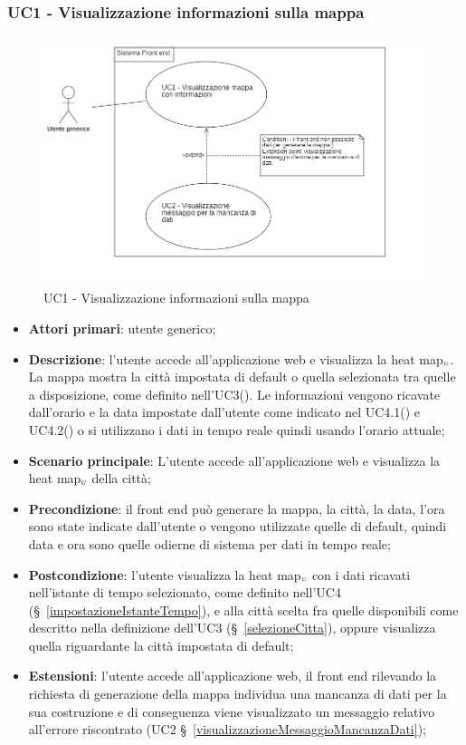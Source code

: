 \subsubsection{UC1 - Visualizzazione informazioni sulla mappa} \label{visualizzazioneInfoMappa} %
\begin{center}
	\begin{figure}[H]
		\includegraphics[scale=0.8]{../immagini/attori_casi/uc1_uc2.png}
		\caption{UC1 - Visualizzazione informazioni sulla mappa}
	\end{figure}
\end{center}
\begin{itemize}
	\item \textbf{Attori primari}: utente generico;
	\item \textbf{Descrizione}: l’utente accede all’applicazione web e visualizza la heat map$_{\scaleto{G}{3pt}}$. La mappa mostra la città impostata di default o quella selezionata tra quelle a disposizione, come definito nell’UC3(). Le informazioni vengono ricavate dall’orario e la data impostate dall’utente come indicato nel UC4.1() e UC4.2() o si utilizzano i dati in tempo reale quindi usando l’orario attuale;
	\item \textbf{Scenario principale}: L’utente accede all’applicazione web e visualizza la heat map$_{\scaleto{G}{3pt}}$ della città;
	\item \textbf{Precondizione}: il front end può generare la mappa, la città, la data, l’ora sono state indicate dall’utente o vengono utilizzate quelle di default, quindi data e ora sono quelle odierne di sistema per dati in tempo reale;
	\item \textbf{Postcondizione}: l’utente visualizza la heat map$_{\scaleto{G}{3pt}}$ con i dati ricavati nell’istante di tempo selezionato, come definito nell’UC4 (\S~\ref{impostazioneIstanteTempo}), e alla città scelta fra quelle disponibili come descritto nella definizione dell’UC3 (\S~\ref{selezioneCitta}), oppure visualizza quella riguardante la città impostata di default;
	\item \textbf{Estensioni}: l’utente accede all’applicazione web, il front end rilevando la richiesta di generazione della mappa individua una mancanza di dati per la sua costruzione e di conseguenza viene visualizzato un messaggio relativo all’errore riscontrato (UC2 \S~\ref{visualizzazioneMessaggioMancanzaDati});
\end{itemize}

